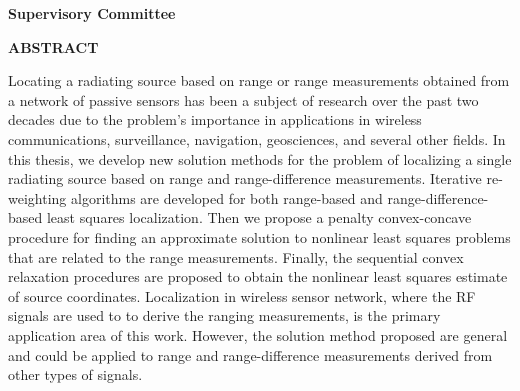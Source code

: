 \newpage
{}

\noindent \textbf{Supervisory Committee}
\tpbreak
\panel

\begin{center}
\textbf{ABSTRACT}
\end{center}


Locating a radiating source based on range or range measurements obtained from a network of passive sensors has been a subject of research over the past two decades due to the problem’s importance in applications in wireless communications, surveillance, navigation, geosciences, and several other fields. In this thesis, we develop  new solution methods for the problem of localizing a single radiating source based on range and range-difference measurements. Iterative re-weighting algorithms are developed for both range-based and range-difference-based least squares localization. Then we propose a penalty convex-concave procedure for finding an approximate solution to nonlinear least squares problems  that are related to the range measurements. Finally, the sequential convex relaxation procedures are proposed to obtain the nonlinear least squares estimate of source coordinates. Localization in wireless sensor network, where the RF signals are used to to derive the ranging measurements,  is the primary application area of this work. However, the solution method proposed are general and could be applied to range and range-difference measurements derived from other types of signals. 